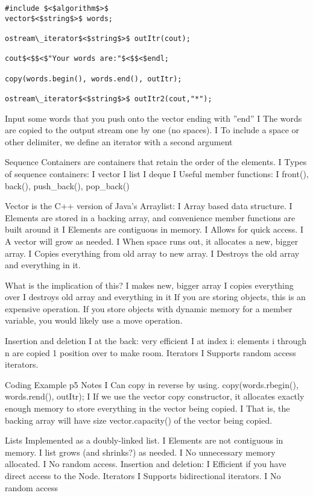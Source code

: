 \documentclass{article}
\begin{document}
{\begin{verbatim}
#include $<$algorithm$>$
vector$<$string$>$ words;

ostream\_iterator$<$string$>$ outItr(cout);

cout$<$$<$"Your words are:"$<$$<$endl;

copy(words.begin(), words.end(), outItr);

ostream\_iterator$<$string$>$ outItr2(cout,"*");
\end{verbatim}


Input some words that you push
onto the vector ending with
”end”
I The words are copied to the
output stream one by one (no
spaces).
I To include a space or other
delimiter, we define an iterator
with a second argument


Sequence Containers are containers that retain the order of the elements.
I Types of sequence containers:
I vector
I list
I deque
I Useful member functions:
I front(), back(), push\_back(), pop\_back()


Vector is the C++ version of Java’s Arraylist:
I Array based data structure.
I Elements are stored in a backing array, and convenience member functions are built
around it
I Elements are contiguous in memory.
I Allows for quick access.
I A vector will grow as needed.
I When space runs out, it allocates a new, bigger array.
I Copies everything from old array to new array.
I Destroys the old array and everything in it.


What is the implication of this?
I makes new, bigger array
I copies everything over
I destroys old array and everything in it
If you are storing objects, this is an expensive operation.
If you store objects with dynamic memory for a member variable, you would likely use
a move operation.


Insertion and deletion
I at the back: very efficient
I at index i: elements i through n are copied 1 position over to make room.
Iterators
I Supports random access iterators.



Coding Example p5 Notes
I Can copy in reverse by using.
copy(words.rbegin(), words.rend(), outItr);
I If we use the vector copy constructor, it allocates exactly enough memory to
store everything in the vector being copied.
I That is, the backing array will have size vector.capacity() of the vector being
copied.


Lists
Implemented as a doubly-linked list.
I Elements are not contiguous in memory.
I list grows (and shrinks?) as needed.
I No unnecessary memory allocated.
I No random access.
Insertion and deletion:
I Efficient if you have direct access to the Node.
Iterators
I Supports bidirectional iterators.
I No random access

}
\end{document}
